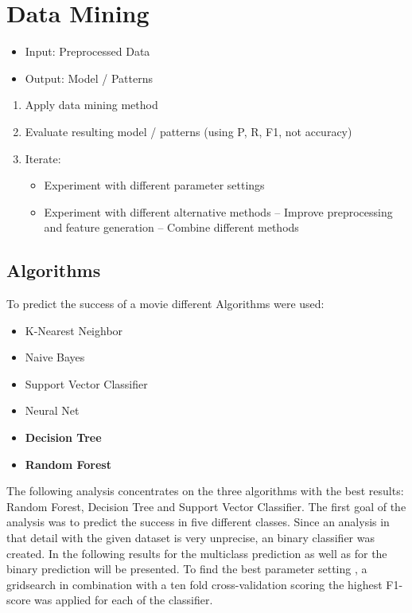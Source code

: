 \chapter{Data Mining}
\label{cha:data_mining}
\begin{itemize}
	\item Input: Preprocessed Data
	\item Output: Model / Patterns
\end{itemize}

\begin{enumerate}
	\item Apply data mining method
	\item Evaluate resulting model / patterns (using P, R, F1, not accuracy)
	\item Iterate:
	\begin{itemize}
		\item Experiment with different parameter settings
		\item Experiment with different alternative methods – Improve preprocessing and feature generation – Combine different methods
	\end{itemize}
\end{enumerate}

\section{Algorithms}
To predict the success of a movie different Algorithms were used:
\begin{itemize}
	\item K-Nearest Neighbor
	\item Naive Bayes
	\item Support Vector Classifier
	\item Neural Net
	\item \textbf{Decision Tree}
	\item \textbf{Random Forest}
\end{itemize}
The following analysis concentrates on the three algorithms with the best results: Random Forest, Decision Tree and Support Vector Classifier.
The first goal of the analysis was to predict the success in five different classes. Since an analysis in that detail with the given dataset is very unprecise, an binary classifier was created. In the following results for the multiclass prediction as well as for the binary prediction will be presented. To find the best parameter setting , a gridsearch in combination with a ten fold cross-validation scoring the highest F1-score was applied for each of the classifier.

